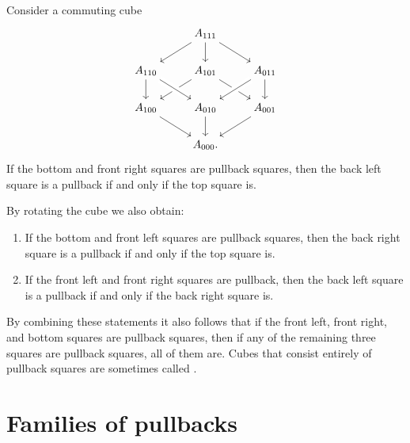 \begin{lem}
Consider a commuting cube
\begin{equation*}
\begin{tikzcd}
& A_{111} \arrow[dl] \arrow[dr] \arrow[d] \\
A_{110} \arrow[d] & A_{101} \arrow[dl] \arrow[dr] & A_{011} \arrow[dl,crossing over] \arrow[d] \\
A_{100} \arrow[dr] & A_{010} \arrow[d] \arrow[from=ul,crossing over] & A_{001} \arrow[dl] \\
& A_{000}.
\end{tikzcd}
\end{equation*}
If the bottom and front right squares are pullback squares, then the back left square is a pullback if and only if the top square is.
\end{lem}

\begin{rmk}
By rotating the cube we also obtain:
\begin{enumerate}
\item If the bottom and front left squares are pullback squares, then the back right square is a pullback if and only if the top square is.
\item If the front left and front right squares are pullback, then the back left square is a pullback if and only if the back right square is.
\end{enumerate}
By combining these statements it also follows that if the front left, front right, and bottom squares are pullback squares, then if any of the remaining three squares are pullback squares, all of them are. Cubes that consist entirely of pullback squares are sometimes called .
\end{rmk}

\section{Families of pullbacks}


